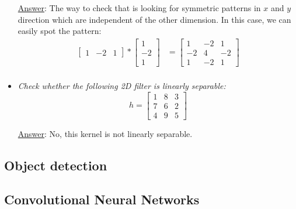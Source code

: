 \begin{itemize}
	\underline{Answer}: The way to check that is looking for symmetric patterns in $x$ and $y$ direction which are independent of the other dimension. In this case, we can easily spot the pattern:
	\begin{equation*}
	\begin{split}
	\left[\begin{array}{ccc}1 & -2 & 1\end{array}\right] *  
	\left[\begin{array}{c}1 \\ -2 \\ 1\end{array}\right] & = \left[\begin{array}{ccc}
	1 & -2 & 1\\ -2 & 4 & -2\\ 1 & -2 & 1
	\end{array}\right]\\
	\end{split}
	\end{equation*}
	\item \textit{Check whether the following 2D filter is linearly separable:}
	$$h = \left[\begin{array}{ccc}
	1 & 8 & 3\\ 7 & 6 & 2\\ 4 & 9 & 5
	\end{array}\right]$$
	
	\underline{Answer}:  No, this kernel is not linearly separable.
\end{itemize}
\subsection{Object detection}

\subsection{Convolutional Neural Networks}
